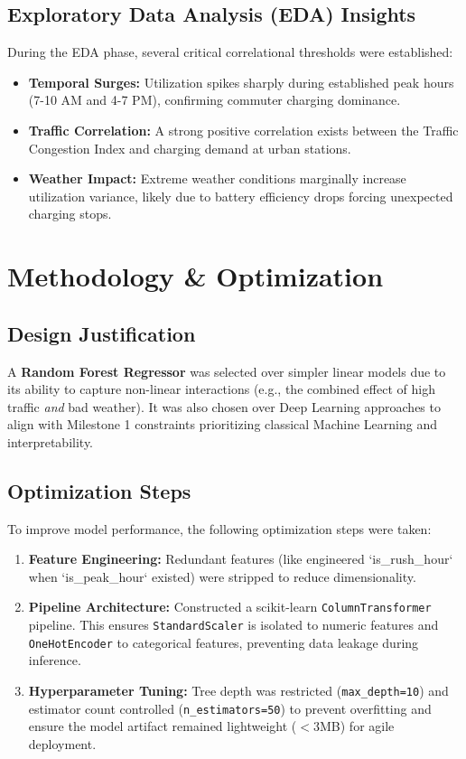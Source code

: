 \documentclass{article}
\begin{document}
\subsection{Exploratory Data Analysis (EDA) Insights}
During the EDA phase, several critical correlational thresholds were established:
\begin{itemize}
    \item \textbf{Temporal Surges:} Utilization spikes sharply during established peak hours (7-10 AM and 4-7 PM), confirming commuter charging dominance.
    \item \textbf{Traffic Correlation:} A strong positive correlation exists between the Traffic Congestion Index and charging demand at urban stations.
    \item \textbf{Weather Impact:} Extreme weather conditions marginally increase utilization variance, likely due to battery efficiency drops forcing unexpected charging stops.
\end{itemize}

\section{Methodology \& Optimization}
\subsection{Design Justification}
A \textbf{Random Forest Regressor} was selected over simpler linear models due to its ability to capture non-linear interactions (e.g., the combined effect of high traffic \textit{and} bad weather). It was also chosen over Deep Learning approaches to align with Milestone 1 constraints prioritizing classical Machine Learning and interpretability.

\subsection{Optimization Steps}
To improve model performance, the following optimization steps were taken:
\begin{enumerate}
    \item \textbf{Feature Engineering:} Redundant features (like engineered `is_rush_hour` when `is_peak_hour` existed) were stripped to reduce dimensionality.
    \item \textbf{Pipeline Architecture:} Constructed a scikit-learn \texttt{ColumnTransformer} pipeline. This ensures \texttt{StandardScaler} is isolated to numeric features and \texttt{OneHotEncoder} to categorical features, preventing data leakage during inference.
    \item \textbf{Hyperparameter Tuning:} Tree depth was restricted (\texttt{max\_depth=10}) and estimator count controlled (\texttt{n\_estimators=50}) to prevent overfitting and ensure the model artifact remained lightweight ($<3$MB) for agile deployment.
\end{enumerate}
\end{document}
